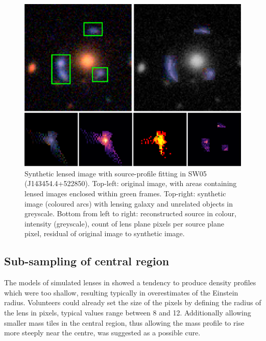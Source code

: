 \begin{figure}
  \includegraphics[width=\linewidth]{img/new_synth_img_detailed}
  \caption{Synthetic lensed image with source-profile fitting in SW05
    (J143454.4+522850). Top-left: original image, with areas
    containing lensed images enclosed within green frames.  Top-right:
    synthetic image (coloured arcs) with lensing galaxy and unrelated
    objects in greyscale.  Bottom from left to right: reconstructed
    source in colour, intensity (greyscale), count of lens plane
    pixels per source plane pixel, residual of original image to
    synthetic image.}
  \label{fig:synthimg}
\end{figure}


\subsection{Sub-sampling of central region}\label{subsec:hires}

The models of simulated lenses in \cite{2015MNRAS.447.2170K} showed a 
tendency 
to produce density profiles which were too shallow, resulting typically
in overestimates of the Einstein radius.
Volunteers could already set the size of the pixels by defining the radius of 
the lens in pixels, typical values range between 8 and 12.
Additionally allowing smaller mass tiles in the
central region, thus allowing the mass profile to rise more steeply
near the centre, was suggested as a possible cure.

